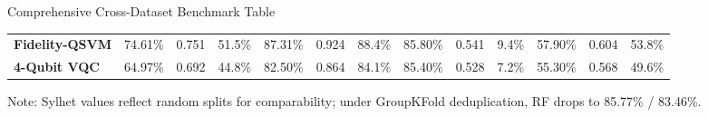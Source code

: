 \documentclass[aspectratio=169, 10pt]{beamer}
\begin{document}
\begin{frame}{Comprehensive Cross-Dataset Benchmark Table}
{\begin{tabular}{lcccccccccccc}
    \textbf{Fidelity-QSVM} & 74.61\% & 0.751 & 51.5\% & 87.31\% & 0.924 & 88.4\% & 85.80\% & 0.541 & 9.4\% & 57.90\% & 0.604 & 53.8\% \\
    \rowcolor{LightCoral}
    \textbf{4-Qubit VQC} & 64.97\% & 0.692 & 44.8\% & 82.50\% & 0.864 & 84.1\% & 85.40\% & 0.528 & 7.2\% & 55.30\% & 0.568 & 49.6\% \\
    \bottomrule
  \end{tabular}%
  }
  \vspace*{3pt}
  {\raggedright\scriptsize\color{MutedText} Note: Sylhet values reflect random splits for comparability; under GroupKFold deduplication, RF drops to 85.77\% / 83.46\%.}
\end{frame}

\end{document}
